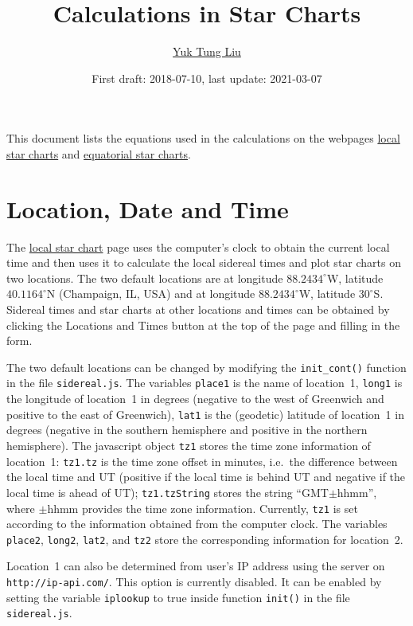 \documentclass[12pt]{article}
\begin{document}
\title{Calculations in Star Charts}
\author{\href{https://publish.illinois.edu/ytliu/}{Yuk Tung Liu}}
\date{First draft: 2018-07-10, last update: 2021-03-07}
\maketitle

This document lists the equations used in the calculations 
on the webpages \href{../sidereal.html}{local star charts} and 
\href{../chartGCRS.html}{equatorial star charts}. 

\section{Location, Date and Time}

The \href{../sidereal.html}{local star chart} page uses the computer's 
clock to obtain the current local time and then uses it to calculate 
the local sidereal times and plot star charts on two locations. 
The two default locations are at longitude $88.2434^\circ$W, 
latitude $40.1164^\circ$N (Champaign, IL, USA) and at longitude $88.2434^\circ$W, 
latitude $30^\circ$S. Sidereal times and star charts at other locations 
and times can be obtained by clicking the Locations and Times button 
at the top of the page and filling in the form. 

The two default locations can be changed by modifying the {\tt init\_cont()} 
function in the file {\tt sidereal.js}. The variables {\tt place1} 
is the name of location~1, {\tt long1} is the longitude of location~1 
in degrees (negative to the west of Greenwich and positive to the east 
of Greenwich), {\tt lat1} is the (geodetic) latitude of location~1 in 
degrees (negative in the southern hemisphere and positive in the northern 
hemisphere). The javascript object {\tt tz1} stores the time zone information 
of location~1: {\tt tz1.tz} is the time zone offset in minutes, i.e.\ the difference 
between the local time and UT (positive if the local time is behind UT and 
negative if the local time is ahead of UT); {\tt tz1.tzString} stores the 
string ``GMT$\pm$hhmm'', where $\pm$hhmm provides the time zone information. 
Currently, {\tt tz1} is set according to the information obtained from the computer clock. 
The variables {\tt place2}, {\tt long2}, {\tt lat2}, and {\tt tz2} 
store the corresponding information for location~2. 

Location~1 can also be determined from user's IP address using the server 
on {\tt http://ip-api.com/}. This option is currently disabled. It can be 
enabled by setting the variable {\tt iplookup} to true inside function {\tt init()} 
in the file {\tt sidereal.js}.
\end{document}
